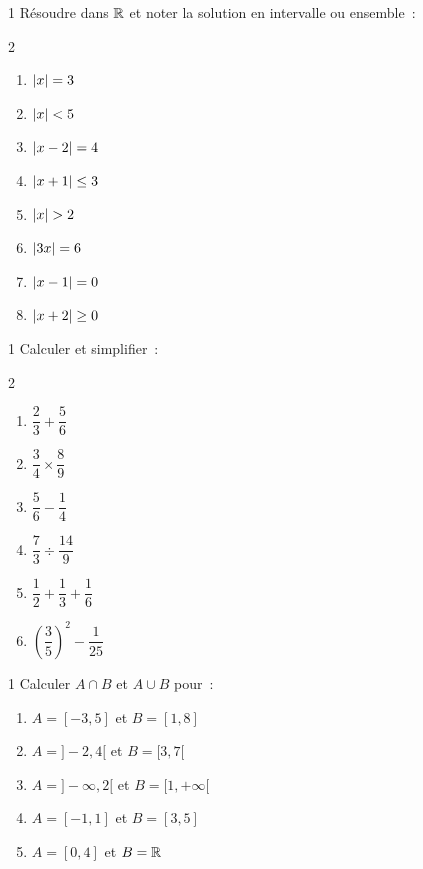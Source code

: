 \begin{exo}{1}
R\'esoudre dans $\mathbb{R}$ et noter la solution en intervalle ou ensemble~:
\begin{multicols}{2}
\begin{enumerate}
  \item $\left|x\right| = 3$
  \item $\left|x\right| < 5$
  \item $\left|x-2\right| = 4$
  \item $\left|x+1\right| \leq 3$
  \item $\left|x\right| > 2$
  \item $\left|3x\right| = 6$
  \item $\left|x-1\right| = 0$
  \item $\left|x+2\right| \geq 0$
\end{enumerate}
\end{multicols}
\end{exo}

\begin{exo}{1}
Calculer et simplifier~:
\begin{multicols}{2}
\begin{enumerate}
  \item $\dfrac{2}{3} + \dfrac{5}{6}$
  \item $\dfrac{3}{4} \times \dfrac{8}{9}$
  \item $\dfrac{5}{6} - \dfrac{1}{4}$
  \item $\dfrac{7}{3} \div \dfrac{14}{9}$
  \item $\dfrac{1}{2} + \dfrac{1}{3} + \dfrac{1}{6}$
  \item $\left(\dfrac{3}{5}\right)^2 - \dfrac{1}{25}$
\end{enumerate}
\end{multicols}
\end{exo}

\begin{exo}{1}
Calculer $A\cap B$ et $A\cup B$ pour~:
\begin{enumerate}
  \item $A = [-3,5]$ et $B = [1,8]$
  \item $A = ]-2,4[$ et $B = [3,7[$
  \item $A = ]-\infty,2[$ et $B = [1,+\infty[$
  \item $A = [-1,1]$ et $B = [3,5]$
  \item $A = [0,4]$ et $B = \mathbb{R}$
\end{enumerate}
\end{exo}

